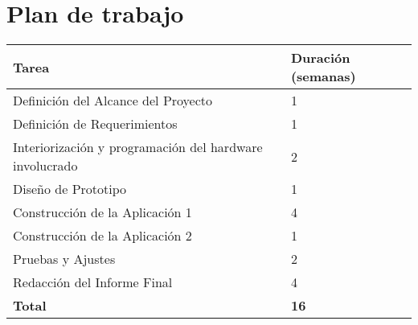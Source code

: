 \chapter{Plan de trabajo}

\begin{table}
\centering
\begin{tabular}[H]{|p{0.8in}|p{3in}|}
\hline
\textbf{Tarea} & \textbf{Duración (semanas)} \\ \hline
Definición del Alcance del Proyecto & 1 \\ \hline
Definición de Requerimientos & 1 \\ \hline
Interiorización y programación del hardware involucrado & 2 \\ \hline
Diseño de Prototipo & 1 \\ \hline
Construcción de la Aplicación 1 & 4 \\ \hline
Construcción de la Aplicación 2 & 1 \\ \hline
Pruebas y Ajustes & 2 \\ \hline
Redacción del Informe Final & 4 \\ \hline
\textbf{Total} & \textbf{16} \\ \hline
\end{tabular}
\end{table}
